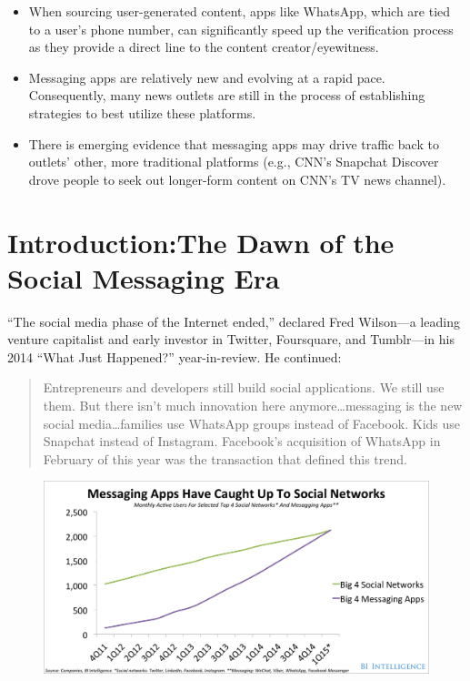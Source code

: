 \documentclass[notoc, symmetric, nobib, nols]{towcenter-guideto-book}
\newcommand{\blankpage}{\newpage\hbox{}\thispagestyle{empty}\newpage}
\begin{document}
\begin{itemize}[itemsep=.5em]
\item When sourcing user-generated content, apps like WhatsApp, which are tied to a user's phone number, can significantly speed up the verification process as they provide a direct line to the content creator/eyewitness.

\item Messaging apps are relatively new and evolving at a rapid pace. Consequently, many news outlets are still in the process of establishing strategies to best utilize these platforms.

\item There is emerging evidence that messaging apps may drive traffic back to outlets' other, more traditional platforms (e.g., CNN's Snapchat Discover drove people to seek out longer-form content on CNN's TV news channel).
\end{itemize}

\blankpage
\chapter[Introduction: The Dawn of the Social Messaging Era]{Introduction:\protect\newline The Dawn of the \protect\newline Social Messaging Era}
\blankpage


``The social media phase of the Internet ended,'' declared Fred Wilson---a leading venture capitalist and early investor in Twitter, Foursquare, and Tumblr---in his 2014 ``What Just Happened?'' year-in-review. He continued: 

\begin{quote}
Entrepreneurs and developers still build social applications. We still use them. But there isn't much innovation here anymore\ldots messaging is the new social media\ldots families use WhatsApp groups instead of Facebook. Kids use Snapchat instead of Instagram. Facebook's acquisition of WhatsApp in February of this year was the transaction that defined this trend.\autocite{AVCwhatjusthappened}
\end{quote}

\begin{figure}
\includegraphics[width=1\textwidth]{graphics/CHATAPPS_Page6_Chart.png}
\end{figure}
\end{document}
